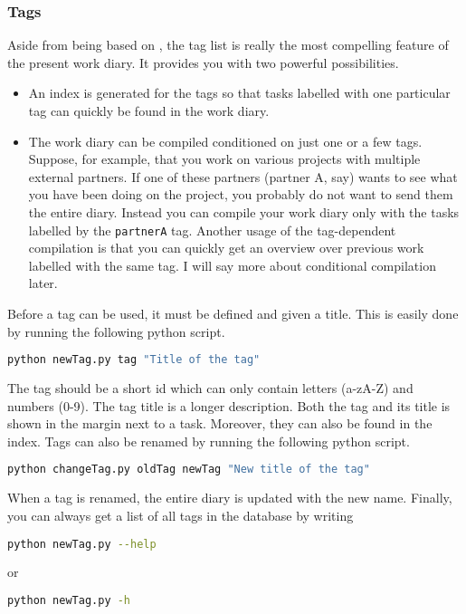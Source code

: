 \subsubsection*{Tags}
Aside from being based on \LaTeXe, the tag list is really the most compelling feature of the present work diary. It provides you with two powerful possibilities.
\begin{itemize}
  \item An index is generated for the tags so that tasks labelled with one particular tag can quickly be found in the work diary.
  \item The work diary can be compiled conditioned on just one or a few tags. Suppose, for example, that you work on various projects with multiple external partners. If one of these partners (partner A, say) wants to see what you have been doing on the project, you probably do not want to send them the entire diary. Instead you can compile your work diary only with the tasks labelled by the {\tt partnerA} tag. Another usage of the tag-dependent compilation is that you can quickly get an overview over previous work labelled with the same tag. I will say more about conditional compilation later.
\end{itemize}
Before a tag can be used, it must be defined and given a title. This is easily done by running the following python script.
\begin{lstlisting}[language=bash]
python newTag.py tag "Title of the tag"
\end{lstlisting}
The tag should be a short id which can only contain letters (a-zA-Z) and numbers (0-9). The tag title is a longer description. Both the tag and its title is shown in the margin next to a task. Moreover, they can also be found in the index. Tags can also be renamed by running the following python script.
\begin{lstlisting}[language=bash]
python changeTag.py oldTag newTag "New title of the tag"
\end{lstlisting}
When a tag is renamed, the entire diary is updated with the new name. Finally, you can always get a list of all tags in the database by writing
\begin{lstlisting}[language=bash]
python newTag.py --help
\end{lstlisting}
or
\begin{lstlisting}[language=bash]
python newTag.py -h
\end{lstlisting}

